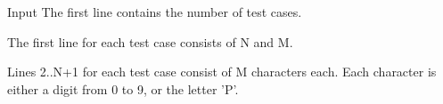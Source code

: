 Input
The first line contains the number of test cases.  

   The first line for each test case consists of N and M.  

   Lines 2..N+1 for each test case consist of M characters each. Each character is either a digit from 0 to 9, or the letter 'P'.